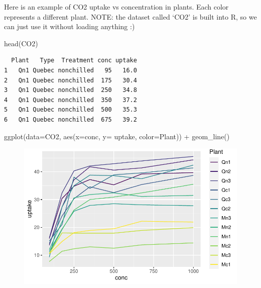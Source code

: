\documentclass[
  letterpaper,
  DIV=11,
  numbers=noendperiod]{scrartcl}
\newenvironment{Shaded}{\begin{snugshade}}{\end{snugshade}}
\newcommand{\AttributeTok}[1]{\textcolor[rgb]{0.40,0.45,0.13}{#1}}
\newcommand{\FunctionTok}[1]{\textcolor[rgb]{0.28,0.35,0.67}{#1}}
\newcommand{\NormalTok}[1]{\textcolor[rgb]{0.00,0.23,0.31}{#1}}
\newcommand{\SpecialCharTok}[1]{\textcolor[rgb]{0.37,0.37,0.37}{#1}}
\begin{document}
Here is an example of CO2 uptake vs concentration in plants. Each color
represents a different plant. NOTE: the dataset called `CO2' is built
into R, so we can just use it without loading anything :)

\begin{Shaded}
\begin{Highlighting}[]
\FunctionTok{head}\NormalTok{(CO2)}
\end{Highlighting}
\end{Shaded}

\begin{verbatim}
  Plant   Type  Treatment conc uptake
1   Qn1 Quebec nonchilled   95   16.0
2   Qn1 Quebec nonchilled  175   30.4
3   Qn1 Quebec nonchilled  250   34.8
4   Qn1 Quebec nonchilled  350   37.2
5   Qn1 Quebec nonchilled  500   35.3
6   Qn1 Quebec nonchilled  675   39.2
\end{verbatim}

\begin{Shaded}
\begin{Highlighting}[]
\FunctionTok{ggplot}\NormalTok{(}\AttributeTok{data=}\NormalTok{CO2, }\FunctionTok{aes}\NormalTok{(}\AttributeTok{x=}\NormalTok{conc, }\AttributeTok{y=}\NormalTok{ uptake, }\AttributeTok{color=}\NormalTok{Plant)) }\SpecialCharTok{+}
  \FunctionTok{geom\_line}\NormalTok{()}
\end{Highlighting}
\end{Shaded}

\begin{figure}[H]

{\centering \includegraphics{basic_graphs_files/figure-pdf/unnamed-chunk-13-1.pdf}

}

\end{figure}
\end{document}
